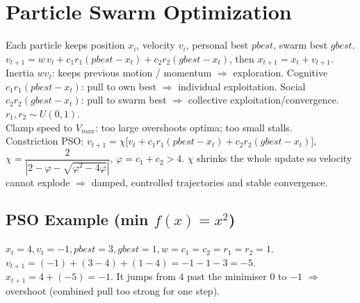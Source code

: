 \section{Particle Swarm Optimization}
Each particle keeps position \(x_i\), velocity \(v_i\), personal best \(pbest\), swarm best \(gbest\).\\
\(v_{t+1}=w\,v_t+c_1 r_1(pbest-x_t)+c_2 r_2(gbest-x_t)\), then \(x_{t+1}=x_t+v_{t+1}\).\\
Inertia \(w v_t\): keeps previous motion / momentum \(\Rightarrow\) exploration. Cognitive \(c_1 r_1(pbest-x_t)\): pull to own best \(\Rightarrow\) individual exploitation. Social \(c_2 r_2(gbest-x_t)\): pull to swarm best \(\Rightarrow\) collective exploitation/convergence. \(r_1,r_2\sim U(0,1)\).\\
Clamp speed to \(V_{max}\): too large overshoots optima; too small stalls.\\
Constriction PSO: \(v_{t+1}=\chi\big[v_t+c_1r_1(pbest-x_t)+c_2r_2(gbest-x_t)\big]\), \(\chi=\dfrac{2}{|2-\varphi-\sqrt{\varphi^2-4\varphi}|}\), \(\varphi=c_1+c_2>4\). \(\chi\) shrinks the whole update so velocity cannot explode \(\Rightarrow\) damped, controlled trajectories and stable convergence.

\subsection*{PSO Example (min \(f(x)=x^2\))}
\(x_t{=}4,v_t{=}-1,pbest{=}3,gbest{=}1,w{=}c_1{=}c_2{=}r_1{=}r_2{=}1\).\\
\(v_{t+1}=(-1)+(3-4)+(1-4)=-1-1-3=-5\).\\
\(x_{t+1}=4+(-5)=-1\). It jumps from \(4\) past the minimiser \(0\) to \(-1\) \(\Rightarrow\) overshoot (combined pull too strong for one step).
